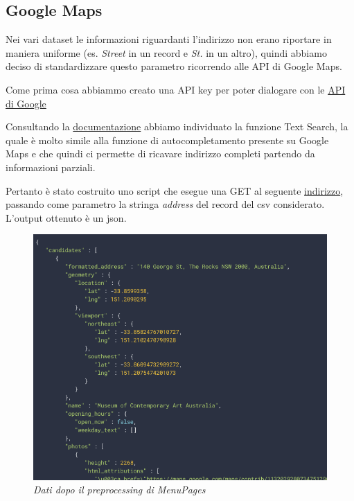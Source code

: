 \documentclass[a4paper,12pt]{article}
\begin{document}
\subsection{Google Maps}
Nei vari dataset le informazioni riguardanti l'indirizzo non erano riportare in maniera uniforme (es. \textit{Street} in un record e \textit{St.} in un altro), quindi abbiamo deciso di standardizzare questo parametro ricorrendo alle API di Google Maps.

Come prima cosa abbiammo creato una API key per poter dialogare con le 
\href{https://console.cloud.google.com/google/maps-apis/overview?project=feisty-nectar-281812&folder=&organizationId=}{API di Google} %


Consultando la \href{https://developers.google.com/places/web-service/search}{documentazione} abbiamo individuato la funzione 
Text Search, la quale è molto simile alla funzione di autocompletamento presente su Google Maps e che quindi ci permette di ricavare indirizzo completi partendo da informazioni parziali.

Pertanto è stato costruito uno script che esegue una GET al seguente \href{https://maps.googleapis.com/maps/api/place/textsearch/json }{indirizzo}, passando come parametro la stringa \textit{address} del record del csv considerato. L'output ottenuto è un json.

\begin{figure}[H]
	\centering
	\includegraphics[width=0.8\linewidth]{img/img.png}
	\caption{\textit{Dati dopo il preprocessing di MenuPages}}
\end{figure}
\end{document}
